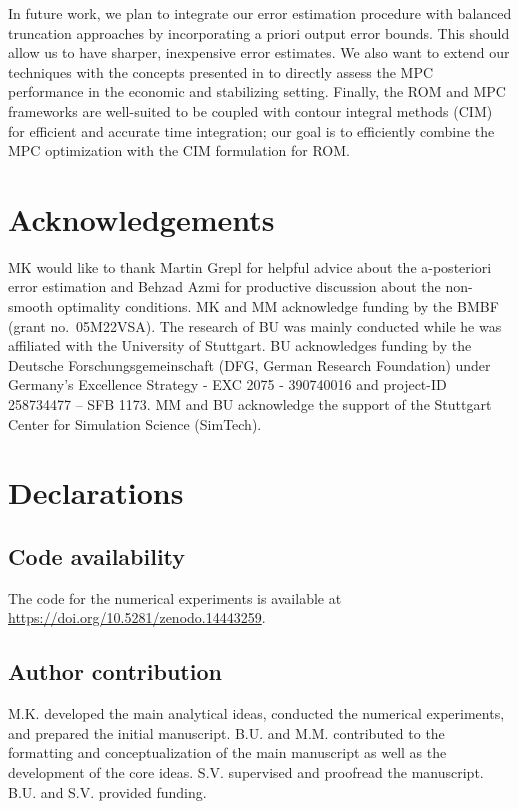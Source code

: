 \documentclass[reqno]{amsart}
\newcommand{\abbr}[1]{\textsf{#1}\xspace}
\newcommand{\ROM}{\abbr{ROM}}
\newcommand{\MPC}{\abbr{MPC}}
\newcommand{\CIM}{\abbr{CIM}}
\begin{document}
In future work, we plan to integrate our error estimation procedure with balanced truncation approaches by incorporating a priori output error bounds. This should allow us to have sharper, inexpensive error estimates. We also want to extend our techniques with the concepts presented in \cite{grune2021performance,DieG23} to directly assess the \MPC performance in the economic and stabilizing setting. Finally, the \ROM and \MPC frameworks are well-suited to be coupled with contour integral methods (\CIM) \cite{GugLM21,GugM23} for efficient and accurate time integration; our goal is to efficiently combine the \MPC optimization with the \CIM formulation for \ROM. 
%
\section*{Acknowledgements} 
MK would like to thank Martin Grepl for helpful advice about the a-posteriori error estimation and Behzad Azmi for productive discussion about the non-smooth optimality conditions.
MK and MM acknowledge funding by the BMBF (grant no.~05M22VSA). The research of BU was mainly conducted while he was affiliated with the University of Stuttgart. BU acknowledges funding by the Deutsche Forschungsgemeinschaft (DFG, German Research Foundation) under Germany's Excellence Strategy - EXC 2075 - 390740016 and project-ID 258734477 -- SFB 1173. MM and BU acknowledge the support of the Stuttgart Center for Simulation Science (SimTech).

\section*{Declarations}


\subsection*{Code availability}
The code for the numerical experiments is available at \url{https://doi.org/10.5281/zenodo.14443259}.

\subsection*{Author contribution}
M.K. developed the main analytical ideas, conducted the numerical experiments, and prepared the initial manuscript. B.U. and M.M. contributed to the formatting and conceptualization of the main manuscript as well as the development of the core ideas. S.V. supervised and proofread the manuscript. B.U. and S.V. provided funding.
\end{document}
